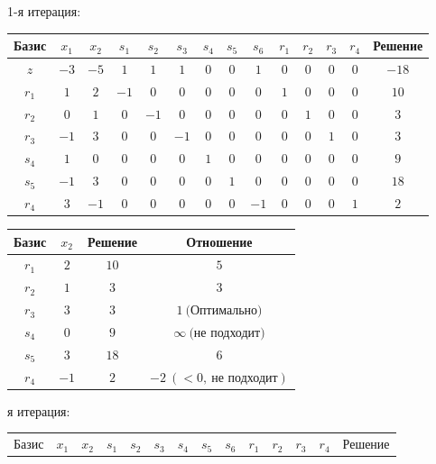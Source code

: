 \documentclass{article}%
\begin{document}
\begin{flushleft}%
1{-}я итерация: %
\newline%
\newline%
\renewcommand{\arraystretch}{1.3}%
\begin{tabular}{|c|cccccccccccc|c|}%
\hline%
Базис&$x_{1}$&$x_{2}$&$s_{1}$&$s_{2}$&$s_{3}$&$s_{4}$&$s_{5}$&$s_{6}$&$r_{1}$&$r_{2}$&$r_{3}$&$r_{4}$&Решение\\%
\hline%
$z$&$-3$&$-5$&$1$&$1$&$1$&$0$&$0$&$1$&$0$&$0$&$0$&$0$&$-18$\\%
\hline%
$r_{1}$&$1$&$2$&$-1$&$0$&$0$&$0$&$0$&$0$&$1$&$0$&$0$&$0$&$10$\\%
$r_{2}$&$0$&$1$&$0$&$-1$&$0$&$0$&$0$&$0$&$0$&$1$&$0$&$0$&$3$\\%
$r_{3}$&$-1$&$3$&$0$&$0$&$-1$&$0$&$0$&$0$&$0$&$0$&$1$&$0$&$3$\\%
$s_{4}$&$1$&$0$&$0$&$0$&$0$&$1$&$0$&$0$&$0$&$0$&$0$&$0$&$9$\\%
$s_{5}$&$-1$&$3$&$0$&$0$&$0$&$0$&$1$&$0$&$0$&$0$&$0$&$0$&$18$\\%
$r_{4}$&$3$&$-1$&$0$&$0$&$0$&$0$&$0$&$-1$&$0$&$0$&$0$&$1$&$2$\\%
\hline%
\end{tabular}%
\newline%
\newline%
\newline%
\begin{tabular}{|cccc|}%
\hline%
Базис&$x_{2}$&Решение&Отношение\\%
\hline%
$r_{1}$&$2$&$10$&$5$\\%
$r_{2}$&$1$&$3$&$3$\\%
$r_{3}$&$3$&$3$&$1\: \text{(Оптимально)}$\\%
$s_{4}$&$0$&$9$&$\infty \: \text{(не подходит)}$\\%
$s_{5}$&$3$&$18$&$6$\\%
$r_{4}$&$-1$&$2$&$-2\: (< 0, \: \text{не подходит})$\\%
\hline%
\end{tabular}%
\newline%
\newline%
я итерация: %
\newline%
\newline%
\renewcommand{\arraystretch}{1.3}%
\begin{tabular}{|c|cccccccccccc|c|}%
\hline%
Базис&$x_{1}$&$x_{2}$&$s_{1}$&$s_{2}$&$s_{3}$&$s_{4}$&$s_{5}$&$s_{6}$&$r_{1}$&$r_{2}$&$r_{3}$&$r_{4}$&Решение\\%

\end{tabular}
\end{flushleft}
\end{document}
